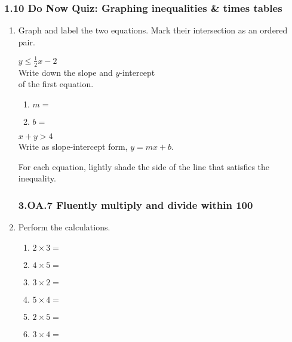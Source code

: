 \documentclass[12pt, twoside]{article}
\begin{document}
\subsubsection*{1.10 Do Now Quiz: Graphing inequalities \& times tables}
\begin{enumerate}
  \item Graph and label the two equations. Mark their intersection as an ordered pair.

  \begin{multicols}{2}
    $y \leq \frac{1}{2}x-2$ \\[0.25cm]
    Write down the slope and $y$-intercept\\ of the first equation.
    \begin{enumerate}
      \item $m=$ \bigskip
      \item $b=$
    \end{enumerate}
    \columnbreak
    $x+y > 4$ \\[0.5cm]
        Write as slope-intercept form, $y=mx+b$.
    \end{multicols}

  \begin{center} %
  \end{center}

For each equation, lightly shade the side of the line that satisfies the inequality.

\newpage
\subsubsection*{3.OA.7 Fluently multiply and divide within 100}

\item Perform the calculations.
  \begin{multicols}{2}
    \begin{enumerate}[itemsep=1cm]
        \item $2 \times 3 =$
        \item $4 \times 5 =$
        \item $3 \times 2 =$
        \item $5 \times 4 =$
        \item $2 \times 5 =$
        \item $3 \times 4 =$
    \end{enumerate}
  \end{multicols} \vspace{1cm}


\end{enumerate}
\end{document}

